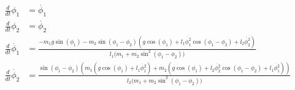 \documentclass{article}
\newcommand{\ddt}{\frac{d}{dt}}
\begin{document}
\begin{align}
 \ddt\phi_{1} &= \dot{\phi_{1}} \\
 \ddt\phi_{2} &= \dot{\phi_{2}} \\
 \ddt\dot{\phi_{1}} &= \frac{-m_{1}g\sin{(\phi_{1})}
                             -m_{2}\sin{(\phi_{1}-\phi_{2})}   
                                   (g\cos{(\phi_{1})}
                                    +l_{1}\dot{\phi_{1}^{2}}\cos{(\phi_{1}-\phi_{2})}
                                    +l_{2}\dot{\phi_{2}^{2}})}
                            {l_{1}(m_{1}+m_{2}\sin^{2}{(\phi_{1}-\phi_{2}))}} \\
 \ddt\dot{\phi_{2}} &= \frac{\sin{(\phi_{1}-\phi_{2})}
                                   (m_{1}(g\cos{(\phi_{1})} 
                                         +l_{1}\dot{\phi_{1}^{2}})
                                    +m_{2}(g\cos{(\phi_{1})}
                                          +l_{2}\dot{\phi_{2}^{2}}\cos{(\phi_{1}-\phi_{2})}
                                          +l_{1}\dot{\phi_{1}^{2}}))}
                            {l_{2}(m_{1}+m_{2}\sin^{2}{(\phi_{1}-\phi_{2}))}}
\end{align}
\end{document}
